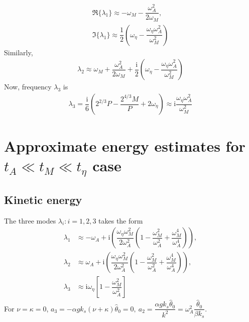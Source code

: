 \documentclass[12pt,psfig]{article}
\begin{document}
\begin{itemize}
\begin{align*}
\Re\{\lambda_1\}\approx -\omega_M-\dfrac{\omega_A^2}{2\omega_M},\\
\Im\{\lambda_1\}\approx  \dfrac{1}{2}\left(\omega_\eta-\dfrac{ \omega_\eta\omega_A^2}{\omega_M^2}\right)
\end{align*}
Similarly, 
\begin{align*}
\lambda_2\approx \omega_M+\dfrac{\omega_A^2}{2\omega_M}+\dfrac{\mathrm{i}}{2}\left(\omega_\eta-\dfrac{ \omega_\eta\omega_A^2}{\omega_M^2}\right)
\end{align*}
Now, frequency $\lambda_3$ is
\begin{align*}
\lambda_3=\dfrac{\mathrm{i}}{6}\left(2^{2/3}P-\dfrac{2^{4/3}M}{P}+2\omega_\eta\right)\approx  \mathrm{i} \dfrac{\omega_\eta\omega_A^2}{\omega_M^2}
\end{align*}
\end{itemize}

\section{Approximate energy estimates for $t_A\ll t_M\ll t_\eta$ case}
\subsection{Kinetic energy}
The three modes $\lambda_i: i=1,2,3$ takes the form
\begin{align*}
\lambda_1&\approx -\omega_A+\mathrm{i}\left(\dfrac{\omega_\eta \omega_M^2}{2 \omega_A^2}\left(1-\dfrac{ \omega_M^2}{\omega_A^2}+\dfrac{\omega_M^4}{\omega_A^4}\right)\right),\\
\lambda_2&\approx \omega_A+\mathrm{i}\left(\dfrac{\omega_\eta \omega_M^2}{2 \omega_A^2}\left(1-\dfrac{ \omega_M^2}{\omega_A^2}+\dfrac{\omega_M^4}{\omega_A^4}\right)\right),\\
\lambda_3&\approx \mathrm{i}\omega_\eta\left[1-\dfrac{\omega_M^2}{\omega_A^2}\right]
\end{align*}
For $\nu=\kappa=0$, $a_3=-\alpha g k_s(\nu+\kappa)\hat{\theta}_0=0, \ a_2=\dfrac{\alpha g k_s \hat{\theta}_0}{k^2}=\omega_A^2\dfrac{\hat{\theta}_0}{\beta k_s}$. 
\end{document}
